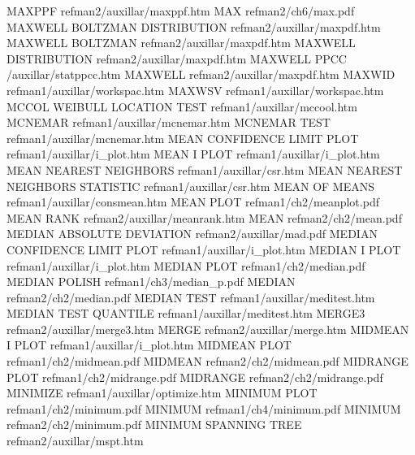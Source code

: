 MAXPPF                                  refman2/auxillar/maxppf.htm
MAX                                     refman2/ch6/max.pdf
MAXWELL BOLTZMAN DISTRIBUTION           refman2/auxillar/maxpdf.htm
MAXWELL BOLTZMAN                        refman2/auxillar/maxpdf.htm
MAXWELL DISTRIBUTION                    refman2/auxillar/maxpdf.htm
MAXWELL PPCC                            /auxillar/statppcc.htm
MAXWELL                                 refman2/auxillar/maxpdf.htm
MAXWID                                  refman1/auxillar/workspac.htm
MAXWSV                                  refman1/auxillar/workspac.htm
MCCOL WEIBULL LOCATION TEST             refman1/auxillar/mccool.htm
MCNEMAR                                 refman1/auxillar/mcnemar.htm
MCNEMAR TEST                            refman1/auxillar/mcnemar.htm
MEAN CONFIDENCE LIMIT PLOT              refman1/auxillar/i_plot.htm
MEAN I PLOT                             refman1/auxillar/i_plot.htm
MEAN NEAREST NEIGHBORS                  refman1/auxillar/csr.htm
MEAN NEAREST NEIGHBORS STATISTIC        refman1/auxillar/csr.htm
MEAN OF MEANS                           refman1/auxillar/consmean.htm
MEAN PLOT                               refman1/ch2/meanplot.pdf
MEAN RANK                               refman2/auxillar/meanrank.htm
MEAN                                    refman2/ch2/mean.pdf
MEDIAN ABSOLUTE DEVIATION               refman2/auxillar/mad.pdf
MEDIAN CONFIDENCE LIMIT PLOT            refman1/auxillar/i_plot.htm
MEDIAN I PLOT                           refman1/auxillar/i_plot.htm
MEDIAN PLOT                             refman1/ch2/median.pdf
MEDIAN POLISH                           refman1/ch3/median_p.pdf
MEDIAN                                  refman2/ch2/median.pdf
MEDIAN TEST                             refman1/auxillar/meditest.htm
MEDIAN TEST QUANTILE                    refman1/auxillar/meditest.htm
MERGE3                                  refman2/auxillar/merge3.htm
MERGE                                   refman2/auxillar/merge.htm
MIDMEAN I PLOT                          refman1/auxillar/i_plot.htm
MIDMEAN PLOT                            refman1/ch2/midmean.pdf
MIDMEAN                                 refman2/ch2/midmean.pdf
MIDRANGE PLOT                           refman1/ch2/midrange.pdf
MIDRANGE                                refman2/ch2/midrange.pdf
MINIMIZE                                refman1/auxillar/optimize.htm
MINIMUM PLOT                            refman1/ch2/minimum.pdf
MINIMUM                                 refman1/ch4/minimum.pdf
MINIMUM                                 refman2/ch2/minimum.pdf
MINIMUM SPANNING TREE                   refman2/auxillar/mspt.htm
